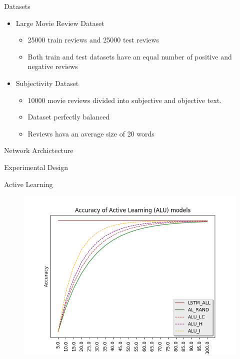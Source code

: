 \documentclass[10pt]{beamer}
\begin{document}
\begin{frame}[fragile]{Datasets}
\begin{itemize}
    \item Large Movie Review Dataset
    \begin{itemize}
    \item 25000 train reviews and 25000 test reviews
    \item Both train and test datasets have an equal number of positive and
        negative reviews
    \end{itemize}
    \vspace{0.5cm}
    \item Subjectivity Dataset
    \begin{itemize}
    \item 10000 movie reviews divided into subjective and objective text.
    \item Dataset perfectly balanced
    \item Reviews hava an average size of 20 words
    \end{itemize}
\end{itemize}
\end{frame}

\begin{frame}[fragile]{Network Archictecture}
    
\end{frame}

\begin{frame}[fragile]{Experimental Design}
    
\end{frame}

\begin{frame}[fragile]{Active Learning}
    \begin{figure}[htp]
        \centering
        \includegraphics[scale=0.6]{images/active_learning_comp_graph.png}
    \end{figure}
\end{frame}
\end{document}
